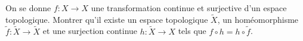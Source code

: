 \documentclass[a4paper,10pt,openany]{article}
\theoremstyle{plain}
\theoremstyle{definition}
\begin{document}
\vspace{0.6cm}

 \vspace{1.5mm} 

\noindent On se donne $f : X \to X$ une transformation continue et surjective d'un espace topologique. Montrer qu'il existe un espace topologique $\widetilde{X}$, un hom\'eomorphisme $\widetilde{f} : \widetilde{X} \to \widetilde{X}$ et une surjection continue $h : \widetilde{X} \to X$ tels que $f \circ h = h \circ \widetilde{f}$.
\end{document}
